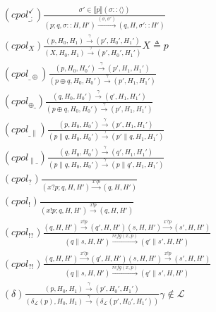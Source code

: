\documentclass[
msc,
irfonts
]{./tex/tehran-thesis}
\newcommand{\پ}{پروژه/پایان‌نامه/رساله }
\theoremstyle{definition}
\theoremstyle{theorem}
\theoremstyle{definition}
\numberwithin{algorithm}{chapter}
\newcommand{\sem}[1]{\llbracket #1 \rrbracket}
\newcommand{\his}[1]{\langle #1 \rangle}
\newcommand{\mc}[1]{\mathcal{#1}}
\begin{document}
\begin{align}
     & (cpol^{\checkmark}_{\_;})
    \frac{\sigma' \in \sem{p}(\sigma::\his{})}
    {(p;q,\sigma::H,H')\xrightarrow{(\sigma,\sigma')}
    (q,H,\sigma'::H') }    \label{os:term}                                 \\
     & (cpol_X)
    \frac{(p,H_0,H_1)\xrightarrow{\gamma}(p',H_0',H_1')}
    {(X,H_0,H_1)\xrightarrow{\gamma}(p',H_0',H_1')}
    X \triangleq p         \label{os:recr}                                 \\
     & (cpol_{\_\oplus})
    \frac{(p,H_0,H_0')\xrightarrow{\gamma}(p',H_1,H_1')}
    {(p\oplus q,H_0,H_0')\xrightarrow{\gamma}(p',H_1,H_1')}
    \label{os:orr}                                                         \\
     & (cpol_{\oplus\_})
    \frac{(q,H_0,H_0')\xrightarrow{\gamma}(q',H_1,H_1')}
    {(p\oplus q,H_0,H_0')\xrightarrow{\gamma}(p',H_1,H_1')} \label{os:orl} \\
     & (cpol_{\_\parallel})
    \frac{(p,H_0,H_0')\xrightarrow{\gamma}(p',H_1,H_1')}
    {(p\parallel q,H_0,H_0')\xrightarrow{\gamma}(p' \parallel q,H_1,H_1')}
    \label{os:parr}                                                        \\
     & (cpol_{\parallel\_})
    \frac{(q,H_0,H_0')\xrightarrow{\gamma}(q',H_1,H_1')}
    {(p\parallel q,H_0,H_0')\xrightarrow{\gamma}(p \parallel q',H_1,H_1')}
    \label{os:parl}                                                        \\
     & (cpol_?)
    \frac{}
    {(x?p;q,H,H')\xrightarrow{x?p}(q,H,H')}
    \label{os:recv}                                                        \\
     & (cpol_!)
    \frac{}
    {(x!p;q,H,H')\xrightarrow{x!p}(q,H,H')}
    \label{os:send}                                                        \\
     & (cpol_{!?})
    \frac{
        (q,H,H') \xrightarrow{x!p}(q',H,H')
        (s,H,H') \xrightarrow{x?p} (s',H,H')
    }{
        (q\parallel s,H,H') \xrightarrow{rcfg(x,p)} (q'\parallel s',H,H')
    }     \label{os:syncr}                                                 \\
     & (cpol_{?!})
    \frac{
        (q,H,H') \xrightarrow{x?p}(q',H,H')
        (s,H,H') \xrightarrow{x!p} (s',H,H')
    }{
        (q\parallel s,H,H') \xrightarrow{rcfg(x,p)} (q'\parallel s',H,H')
    } \label{os:syncl} \\
    & (\delta) \frac{
        (p,H_0,H_1) \xrightarrow{\gamma} (p',H_0',H_1')
    }{
        (\delta_{\mc{L}}(p),H_0,H_1)
        \xrightarrow{\gamma}
        (\delta_{\mc{L}}(p',H_0',H_1'))
    }\gamma \not \in \mc{L} \label{os:restrict}
\end{align}
\end{document}
